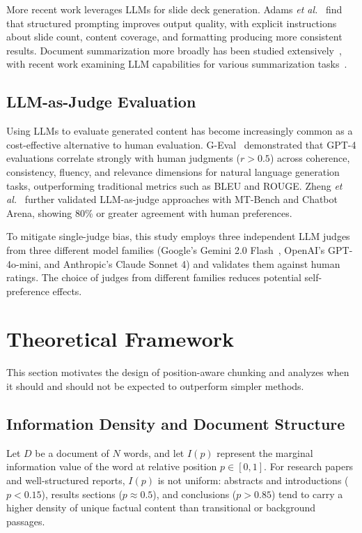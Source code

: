 \documentclass{ieeeaccess}
\begin{document}
More recent work leverages LLMs for slide deck generation. Adams \emph{et al.}~\cite{b22} find that structured prompting improves output quality, with explicit instructions about slide count, content coverage, and formatting producing more consistent results. Document summarization more broadly has been studied extensively~\cite{b23}, with recent work examining LLM capabilities for various summarization tasks~\cite{b24}.

\subsection{LLM-as-Judge Evaluation}

Using LLMs to evaluate generated content has become increasingly common as a cost-effective alternative to human evaluation. G-Eval~\cite{b25} demonstrated that GPT-4 evaluations correlate strongly with human judgments ($r > 0.5$) across coherence, consistency, fluency, and relevance dimensions for natural language generation tasks, outperforming traditional metrics such as BLEU and ROUGE. Zheng \emph{et al.}~\cite{b26} further validated LLM-as-judge approaches with MT-Bench and Chatbot Arena, showing 80\% or greater agreement with human preferences.

To mitigate single-judge bias, this study employs three independent LLM judges from three different model families (Google's Gemini 2.0 Flash~\cite{b27}, OpenAI's GPT-4o-mini, and Anthropic's Claude Sonnet 4) and validates them against human ratings. The choice of judges from different families reduces potential self-preference effects.

\section{Theoretical Framework}
\label{sec:theory}

This section motivates the design of position-aware chunking and analyzes when it should and should not be expected to outperform simpler methods.

\subsection{Information Density and Document Structure}

Let $D$ be a document of $N$ words, and let $I(p)$ represent the marginal information value of the word at relative position $p \in [0, 1]$. For research papers and well-structured reports, $I(p)$ is not uniform: abstracts and introductions ($p < 0.15$), results sections ($p \approx 0.5$), and conclusions ($p > 0.85$) tend to carry a higher density of unique factual content than transitional or background passages.
\end{document}
